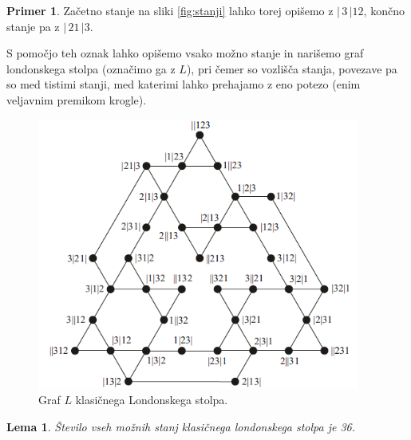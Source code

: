 \documentclass[12pt,a4paper]{amsart}
\theoremstyle{definition} %
\newtheorem{primer}[definicija]{Primer}
\theoremstyle{plain} %
\newtheorem{lema}[definicija]{Lema}
\newcommand{\bd}{\ensuremath{|\,}}
\newcommand{\ed}{\ensuremath{\,|}}
\begin{document}
\begin{primer}
    Začetno stanje na sliki \ref{fig:stanji} lahko torej opišemo z $\bd 3 \ed 12$, končno stanje pa z $\bd 21 \ed 3$.
\end{primer}

S pomočjo teh oznak lahko opišemo vsako možno stanje in narišemo graf londonskega stolpa (označimo ga z $L$), pri čemer so vozlišča stanja, povezave pa so med tistimi stanji, med katerimi lahko prehajamo z eno potezo (enim veljavnim premikom krogle).

\begin{figure}[h!]
    \includegraphics[width=300pt]{img/tolgraph.png}
    \caption{Graf $L$ klasičnega Londonskega stolpa.}
    \label{fig:tolgraph}
\end{figure}

\begin{lema}
    Število vseh možnih stanj klasičnega londonskega stolpa je 36.
\end{lema}
\end{document}
